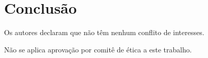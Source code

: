 \documentclass[portuguese]{sbcreviews-2025}%
\begin{document}
\section{Conclusão}
\label{sec:conclusao}

\begin{declarations}

\begin{acknowledgements}
\end{acknowledgements}

\begin{funding}
\end{funding}

\begin{contributions}
\end{contributions}

\begin{interests}
Os autores declaram que não têm nenhum conflito de interesses.
\end{interests}

\begin{materials}
\end{materials}

\begin{aitools}
\end{aitools}

\begin{furtherinformation}
Não se aplica aprovação por comitê de ética a este trabalho.
\end{furtherinformation}

\end{declarations}



\end{document}
